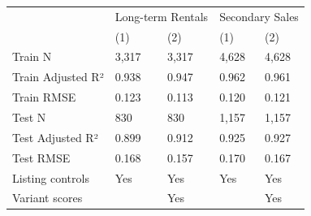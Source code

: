 \begin{tabular}{lllll}
\toprule
 & \multicolumn{2}{r}{Long-term Rentals} & \multicolumn{2}{r}{Secondary Sales} \\
 & (1) & (2) & (1) & (2) \\
\midrule
Train N & 3,317 & 3,317 & 4,628 & 4,628 \\
Train Adjusted R² & 0.938 & 0.947 & 0.962 & 0.961 \\
Train RMSE & 0.123 & 0.113 & 0.120 & 0.121 \\
Test N & 830 & 830 & 1,157 & 1,157 \\
Test Adjusted R² & 0.899 & 0.912 & 0.925 & 0.927 \\
Test RMSE & 0.168 & 0.157 & 0.170 & 0.167 \\
Listing controls & Yes & Yes & Yes & Yes \\
Variant scores &  & Yes &  & Yes \\
\bottomrule
\end{tabular}
